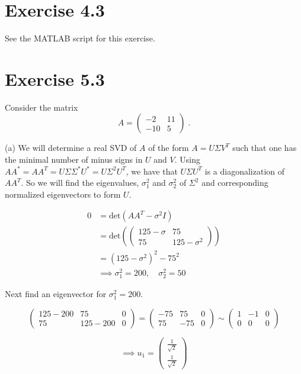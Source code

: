 \documentclass[11pt]{article}
\begin{document}
\section*{Exercise 4.3}

See the MATLAB script for this exercise.

\section*{Exercise 5.3}

Consider the matrix 
$$A = \begin{pmatrix}
-2 & 11 \\ -10 & 5
\end{pmatrix} \; .$$

(a) We will determine a real SVD of $A$ of the form $A = U\Sigma V^T$ such that one has the minimal number of minus signs in $U$ and $V$. Using $AA^* = AA^T = U\Sigma\Sigma^*U^* = U\Sigma^2U^T$, we have that $U\Sigma U^T$ is a diagonalization of $AA^T$. So we will find the eigenvalues, $\sigma_1^2$ and $\sigma_2^2$ of $\Sigma^2$ and corresponding normalized eigenvectors to form $U$. 

\begin{align*}
0 &= \text{det}(AA^T - \sigma^2 I) \\
&= \text{det} \left(\begin{pmatrix}
125 - \sigma & 75 \\ 75 & 125-\sigma^2
\end{pmatrix} \right) \\
&= (125-\sigma^2)^2 - 75^2\\
& \implies \sigma_1^2 = 200, \quad \sigma_2^2 = 50
\end{align*}

Next find an eigenvector for $\sigma_1^2 = 200$.

$$\begin{pmatrix}
125-200 & 75 & 0\\ 75 & 125-200 & 0
\end{pmatrix} = \begin{pmatrix}
-75 & 75 & 0\\ 75 & -75 & 0
\end{pmatrix} \sim  \begin{pmatrix}
1&-1&0 \\ 0&0&0
\end{pmatrix}$$

$$\implies u_1 = \begin{pmatrix}
\frac{1}{\sqrt{2}} \\ \frac{1}{\sqrt{2}}
\end{pmatrix}$$
\end{document}
